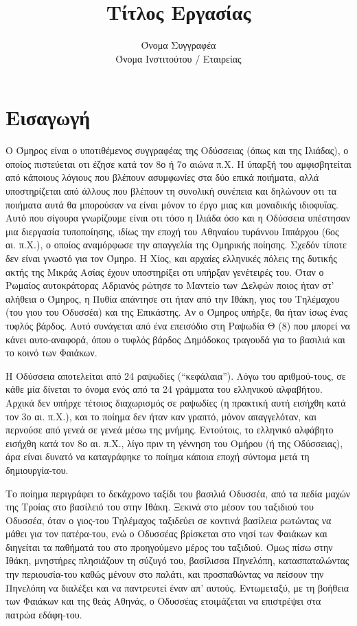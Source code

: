 \documentclass[11pt]{article}
\title{\textbf{Τίτλος Εργασίας}}
\author{Όνομα Συγγραφέα \\ Όνομα Ινστιτούτου / Εταιρείας}
\date{}
\begin{document}
\maketitle

\section{Εισαγωγή}
Ο Όμηρος είναι ο υποτιθέμενος συγγραφέας της Οδύσσειας (όπως και της Ιλιάδας), ο οποίος πιστεύεται οτι έζησε κατά τον 8ο ή 7ο αιώνα π.Χ. Η ύπαρξή του αμφισβητείται από κάποιους λόγιους που βλέπουν ασυμφωνίες στα δύο επικά ποιήματα, αλλά υποστηρίζεται από άλλους που βλέπουν τη συνολική συνέπεια και δηλώνουν οτι τα ποιήματα αυτά θα μπορούσαν να είναι μόνον το έργο μιας και μοναδικής ιδιοφυΐας. Αυτό που σίγουρα γνωρίζουμε είναι οτι τόσο η Ιλιάδα όσο και η Οδύσσεια υπέστησαν μια διεργασία τυποποίησης, ιδίως την εποχή του Αθηναίου τυράννου Ιππάρχου (6ος αι. π.Χ.), ο οποίος αναμόρφωσε την απαγγελία της Ομηρικής ποίησης. Σχεδόν τίποτε δεν είναι γνωστό για τον Όμηρο. Η Χίος, και αρχαίες ελληνικές πόλεις της δυτικής ακτής της Μικράς Ασίας έχουν υποστηρίξει οτι υπήρξαν γενέτειρές του. Όταν ο Ρωμαίος αυτοκράτορας Αδριανός ρώτησε το Μαντείο των Δελφών ποιος ήταν στ’ αλήθεια ο Όμηρος, η Πυθία απάντησε οτι ήταν από την Ιθάκη, γιος του Τηλέμαχου (του γιου του Οδυσσέα) και της Επικάστης. Αν ο Όμηρος υπήρξε, θα ήταν ίσως ένας τυφλός βάρδος. Αυτό συνάγεται από ένα επεισόδιο στη Ραψωδία Θ (8) που μπορεί να κάνει αυτο-αναφορά, όπου ο τυφλός βάρδος Δημόδοκος τραγουδά για το βασιλιά και το κοινό των Φαιάκων.

Η Οδύσσεια αποτελείται από 24 ραψωδίες (“κεφάλαια”). Λόγω του αριθμού-τους, σε κάθε μία δίνεται το όνομα ενός από τα 24 γράμματα του ελληνικού αλφαβήτου. Αρχικά δεν υπήρχε τέτοιος διαχωρισμός σε ραψωδίες (η πρακτική αυτή εισήχθη κατά τον 3ο αι. π.Χ.), και το ποίημα δεν ήταν καν γραπτό, μόνον απαγγελόταν, και περνούσε από γενεά σε γενεά μέσω της μνήμης. Εντούτοις, το ελληνικό αλφάβητο εισήχθη κατά τον 8ο αι. π.Χ., λίγο πριν τη γέννηση του Ομήρου (ή της Οδύσσειας), άρα είναι δυνατό να καταγράφηκε το ποίημα κάποια εποχή σύντομα μετά τη δημιουργία-του.

Το ποίημα περιγράφει το δεκάχρονο ταξίδι του βασιλιά Οδυσσέα, από τα πεδία μαχών της Τροίας στο βασίλειό του στην Ιθάκη. Ξεκινά στο μέσον του ταξιδιού του Οδυσσέα, όταν ο γιος-του Τηλέμαχος ταξιδεύει σε κοντινά βασίλεια ρωτώντας να μάθει για τον πατέρα-του, ενώ ο Οδυσσέας βρίσκεται στο νησί των Φαιάκων και διηγείται τα παθήματά του στο προηγούμενο μέρος του ταξιδιού. Όμως πίσω στην Ιθάκη, μνηστήρες πλησιάζουν τη σύζυγό του, βασίλισσα Πηνελόπη, κατασπαταλώντας την περιουσία-του καθώς μένουν στο παλάτι, και προσπαθώντας να πείσουν την Πηνελόπη να διαλέξει και να παντρευτεί έναν απ’ αυτούς. Εντωμεταξύ, με τη βοήθεια των Φαιάκων και της θεάς Αθηνάς, ο Οδυσσέας ετοιμάζεται να επιστρέψει στα πατρώα εδάφη-του.
\end{document}
